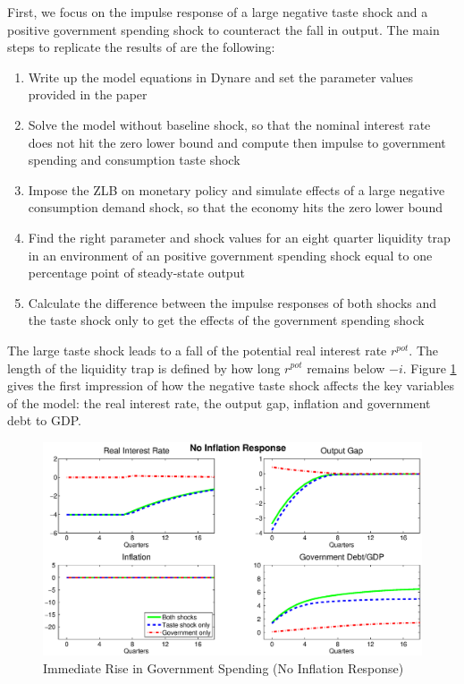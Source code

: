 \documentclass[12pt,a4paper,oneside,titlepage]{article}
\begin{document}
First, we focus on the impulse response of a large negative taste shock and a positive government spending shock to counteract the fall in output. The main steps to replicate the results of \citet{Erceg.2014} are the following:
\begin{enumerate}
\item Write up the model equations in Dynare and set the parameter values provided in the paper\vspace{-0.3cm}
\item Solve the model without baseline shock, so that the nominal interest rate does not hit the zero lower bound and compute then impulse to government spending and consumption taste shock\vspace{-0.3cm}
\item Impose the ZLB on monetary policy and simulate effects of a large negative consumption demand shock, so that the economy hits the zero lower bound\vspace{-0.3cm}
\item Find the right parameter and shock values for an eight quarter liquidity trap in an environment of an positive government spending shock equal to one percentage point of steady-state output\vspace{-0.3cm}
\item Calculate the difference between the impulse responses of both shocks and the taste shock only to get the effects of the government spending shock
\end{enumerate}
The large taste shock leads to a fall of the potential real interest rate $r^{pot}$. The length of the liquidity trap is defined by how long $r^{pot}$ remains below $-i$.
Figure \ref{IRnoinflation} gives the first impression of how the negative taste shock affects the key variables of the model: the real interest rate, the output gap, inflation and government debt to GDP.
\begin{figure}[th]
\includegraphics[width=\textwidth]{Paperpics/Figure2noIR}
\caption{Immediate Rise in Government Spending (No Inflation Response)}
\label{IRnoinflation}
\end{figure}
\end{document}

